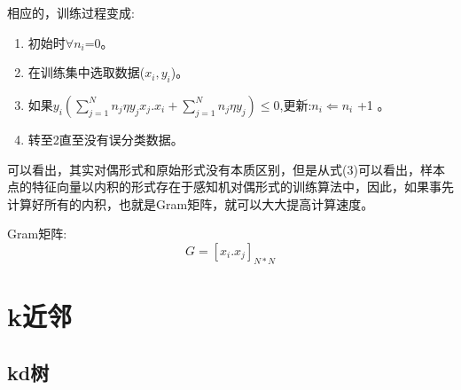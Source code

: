 \documentclass[16pt,UTF8]{ctexart}
\begin{document}
\indent 相应的，训练过程变成:
\begin{enumerate}
\item 初始时$\forall n_i$=0。
\item 在训练集中选取数据($x_i,y_i$)。
\item 如果$y_i(\sum_{j=1}^N n_j \eta y_j x_j .x_i + \sum_{j=1}^N n_j \eta y_j) \leq 0$,更新:$n_i \Leftarrow n_i$ +1 。
\item 转至2直至没有误分类数据。
\end{enumerate}
\indent 可以看出，其实对偶形式和原始形式没有本质区别，但是从式(3)可以看出，样本点的特征向量以内积的形式存在于感知机对偶形式的训练算法中，因此，如果事先计算好所有的内积，也就是Gram矩阵，就可以大大提高计算速度。

\indent Gram矩阵:
$$ G = [x_i.x_j]_{N*N}$$

\section{k近邻}
\subsection{kd树}
\end{document}
